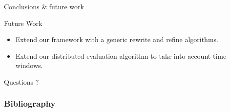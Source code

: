 \documentclass[xcolor=pdftex,dvipsnames,table]{beamer}
\begin{document}
\begin{frame}{Conclusions \& future work}
  \begin{block}{Future Work}
   \begin{itemize}
     \item Extend our framework with a generic rewrite and refine algorithms.
     \pause
     \item Extend our distributed evaluation algorithm to take into account time windows.
   \end{itemize}
  \end{block}
\end{frame}


\begin{frame}[c]{ }
  \centering
  \huge Questions ?
\end{frame}


\begin{frame}[allowframebreaks]
  \frametitle{Bibliography}
  
  
\end{frame}
\end{document}
